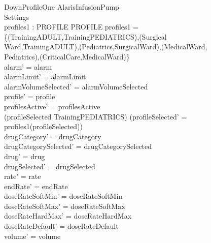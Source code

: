 \begin{schema}{DownProfileOne}
	\Delta AlarisInfusionPump\\
	
	 Settings\\
	 \pagebreak 
	profiles1 : PROFILE \rel PROFILE
	\where
	profiles1 = \{(TrainingADULT,TrainingPEDIATRICS),(Surgical\\
	Ward,TrainingADULT),(Pediatrics,SurgicalWard),(MedicalWard,\\
	Pediatrics),(CriticalCare,MedicalWard)\}\\
	alarm' = alarm\\
	alarmLimit' = alarmLimit\\
	alarmVolumeSelected' = alarmVolumeSelected\\
	profile' = profile\\
	profilesActive' = profilesActive\\  
	(profileSelected \neq TrainingPEDIATRICS) \land (profileSelected' = \\
	profiles1(profileSelected))\\
	drugCategory' = drugCategory\\ drugCategorySelected' = drugCategorySelected\\
	drug' = drug\\ drugSelected' = drugSelected\\
	rate' = rate\\
	endRate' = endRate\\
	doseRateSoftMin' = doseRateSoftMin\\
	doseRateSoftMax' = doseRateSoftMax\\
	doseRateHardMax' = doseRateHardMax\\
	doseRateDefault' = doseRateDefault\\
	volume' = volume\\

\end{schema}
